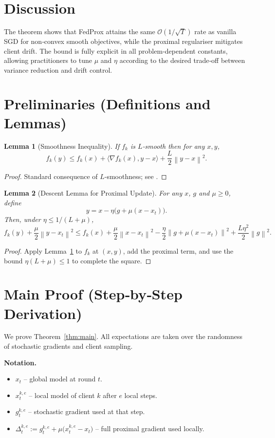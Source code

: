 \documentclass{article}
\newtheorem{lemma}{Lemma}
\newcommand{\norm}[1]{\left\|#1\right\|}
\newcommand{\inner}[2]{\langle #1,#2\rangle}
\begin{document}
\section*{Discussion}
The theorem shows that FedProx attains the same $\mathcal{O}(1/\sqrt{T})$ rate as vanilla SGD for non‑convex smooth objectives, while the proximal regulariser mitigates client drift. The bound is fully explicit in all problem‑dependent constants, allowing practitioners to tune $\mu$ and $\eta$ according to the desired trade‑off between variance reduction and drift control.

\newpage
\section*{Preliminaries (Definitions and Lemmas)}
\begin{lemma}[Smoothness Inequality]\label{lem:smooth}
If $f_k$ is $L$‑smooth then for any $x,y$,
\[
f_k(y)\le f_k(x)+\inner{\nabla f_k(x)}{y-x}
+\frac{L}{2}\norm{y-x}^2 .
\]
\end{lemma}
\begin{proof}
Standard consequence of $L$‑smoothness; see \cite{nesterov2004introductory}. \qedhere
\end{proof}

\begin{lemma}[Descent Lemma for Proximal Update]\label{lem:prox-descent}
For any $x$, $g$ and $\mu\ge0$, define
\[
y = x-\eta\big(g+\mu(x-x_t)\big).
\]
Then, under $\eta\le 1/(L+\mu)$,
\[
f_k(y)+\frac{\mu}{2}\norm{y-x_t}^2
\le f_k(x)+\frac{\mu}{2}\norm{x-x_t}^2
-\frac{\eta}{2}\norm{g+\mu(x-x_t)}^2
+\frac{L\eta^2}{2}\norm{g}^2 .
\]
\end{lemma}
\begin{proof}
Apply Lemma~\ref{lem:smooth} to $f_k$ at $(x,y)$, add the proximal term,
and use the bound $\eta(L+\mu)\le1$ to complete the square.
\end{proof}

\section*{Main Proof (Step‑by‑Step Derivation)}
We prove Theorem~\ref{thm:main}.  
All expectations are taken over the randomness of stochastic gradients and client sampling.

\noindent\textbf{Notation.}
\begin{itemize}[noitemsep]
\item $x_t$ – global model at round $t$.
\item $x_{t}^{k,e}$ – local model of client $k$ after $e$ local steps.
\item $g_{t}^{k,e}$ – stochastic gradient used at that step.
\item $\Delta_{t}^{k,e}:=g_{t}^{k,e}+\mu\big(x_{t}^{k,e}-x_t\big)$ – full proximal gradient used locally.
\end{itemize}
\end{document}
